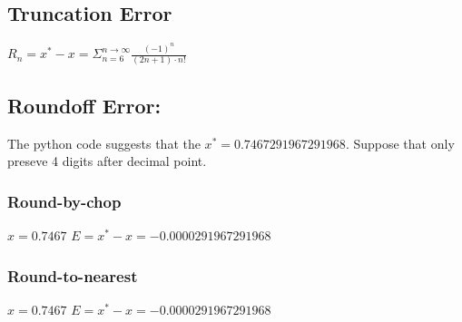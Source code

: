 \documentclass[12pt]{article}
\begin{document}
\subsection*{Truncation Error}
\begin{center}
    \(R_n = x^* - x = \Sigma_{n = 6}^{n \to \infty}\frac{{(-1)^{n}}}{(2n+1) \cdot n!}\)  
\end{center}
\subsection*{Roundoff Error:}
The python code suggests that the \(x^* =  0.7467291967291968.\) Suppose that only preseve 4 digits after decimal point.
\subsubsection*{Round-by-chop}
\begin{center}
    \(x = 0.7467\) \(E = x^* - x = -0.0000291967291968 \)
\end{center}
\subsubsection*{Round-to-nearest}
\begin{center}
    \(x = 0.7467\) \(E = x^* - x = -0.0000291967291968 \)
\end{center}
\end{document}
